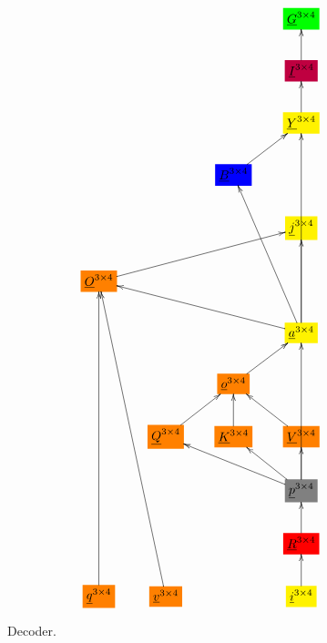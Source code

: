 \documentclass[12pt]{article}
\begin{document}
\begin{figure}[h!]\centering
$$\xymatrix{
&&&*+[F*:green]{\underline{G}^{3\times  4}}
\\
&&&*+[F*:purple]{\underline{I}^{3\times  4}}\ar[u]
\\
&&&*+[F*:yellow]{\underline{Y}^{3\times  4}}\ar[u]
\\
&&*+[F*:blue]{\underline{B}^{3\times  4}}\ar[ur]&
\\
&&&*+[F*:yellow]{\underline{j}^{3\times  4}}
\\
*+[F*:orange]{\underline{O}^{3\times  4}}\ar[urrr]&&&
\\
&&&*+[F*:yellow]{\underline{a}^{3\times  4}}\ar[uuuu]\ar[uuul]\ar[uu]\ar[ulll]
\\
&&*+[F*:orange]{\underline{o}^{3\times  4}}\ar[ur]&
\\
&*+[F*:orange]{\underline{Q}^{3\times  4}}\ar[ur]&*+[F*:orange]{\underline{K}^{3\times  4}}\ar[u]&*+[F*:orange]{\underline{V}^{3\times  4}}\ar[ul]
\\
&&&*+[F*:gray]{\underline{p}^{3\times  4}}\ar[uuu]\ar[ull]\ar[ul]\ar[u]
\\
&&&*+[F*:red]{\underline{R}^{3\times  4}}\ar[u]
\\
*+[F*:orange]{\underline{q}^{3\times  4}}\ar[uuuuuu]&*+[F*:orange]{\underline{v}^{3\times  4}}\ar[uuuuuul]&&*+[F*:yellow]{\underline{i}^{3\times  4}}\ar[u]
}$$
\caption{Decoder.}
\label{fig-texnn-for-transformer-decoder}
\end{figure}
\end{document}
